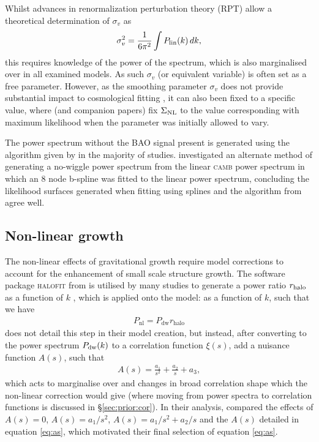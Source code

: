 \documentclass[titlesmallcaps, examinerscopy, copyrightpage]{uqthesis}
\newcommand{\camb}{\textsc{camb}}
\newcommand{\halofit}{\textsc{halofit}}
\begin{document}
Whilst advances in renormalization perturbation theory (RPT)  \citep{CrocceScoccimarro2008} allow a theoretical determination of $\sigma_v$ as
\begin{align}
\sigma_v^2 = \frac{1}{6\pi^2} \int P_{\rm{lin}}(k)\, dk,
\end{align}
this requires knowledge of the power of the spectrum, which is also marginalised over in all examined models. As such $\sigma_v$ (or equivalent variable) is often set as a free parameter. However, as the smoothing parameter $\sigma_v$ does not provide substantial impact to cosmological fitting \citep{ReidPercival2010, XuPadmanabhan2012}, it can also been fixed to a specific value, where \citet{XuPadmanabhan2012} (and companion papers) fix $\Sigma_{\rm{NL}}$ to the value corresponding with maximum likelihood when the parameter was initially allowed to vary.



The power spectrum without the BAO signal present is generated using the algorithm given by \citet{EisensteinHu1998} in the majority of studies. \citet{ReidPercival2010} investigated an alternate method of generating a no-wiggle power spectrum from the linear \camb{} power spectrum in which an 8 node b-spline was fitted to the linear power spectrum, concluding the likelihood surfaces generated when fitting using splines and the algorithm from \citet{EisensteinHu1998} agree well.


\subsection{Non-linear growth}

The non-linear effects of gravitational growth require model corrections to account for the enhancement of small scale structure growth. The software package \halofit{} from \citet{Smith2003} is utilised by many studies to generate a power ratio $r_{\rm{halo}}$ as a function of $k$ \citep{ReidPercival2010, BlakeDavis2011, ChuangWang2012}, which is applied onto the model:
 as a function of $k$, such that we have
\begin{align}
P_{\text{nl}} = P_{\text{dw}} r_{\text{halo}}
\end{align}
\citet{XuPadmanabhan2012} does not detail this step in their model creation, but instead, after converting to the power spectrum $P_{\rm{dw}}(k)$ to a correlation function $\xi(s)$, add a nuisance function $A(s)$, such that
\begin{align} \label{eq:as}
A(s) = \frac{a_1}{s^2} + \frac{a_2}{s} + a_3,
\end{align}
which acts to marginalise over and changes in broad correlation shape which the non-linear correction would give (where moving from power spectra to correlation functions is discussed in \S\ref{sec:prior:cor}). In their analysis, \citet{XuPadmanabhan2012} compared the effects of $A(s) = 0$, $A(s) = a_1 / s^2$, $A(s) = a_1 / s^2 + a_2 / s$ and the $A(s)$ detailed in equation \eqref{eq:as}, which motivated their final selection of equation \eqref{eq:as}.
\end{document}
